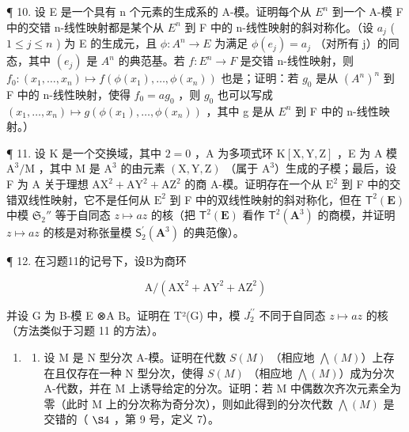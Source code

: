 ¶ 10. 设 E 是一个具有 n 个元素的生成系的 A-模。证明每个从 \(E^{n}\) 到一个 A-模 F 中的交错 n-线性映射都是某个从 \(E^{n}\) 到 F 中的 n-线性映射的斜对称化。（设 \(a_{j}\) ( \(1 \leqslant j \leqslant n\) ) 为 E 的生成元，且 \(\phi: A^{n} \rightarrow E\) 为满足 \(\phi(e_{j}) = a_{j}\) （对所有 j）的同态，其中 \((e_{j})\) 是 \(A^{n}\) 的典范基。若 \(f: E^{n} \rightarrow F\) 是交错 n-线性映射，则 \(f_{0}: (x_{1}, \ldots, x_{n}) \mapsto f(\phi(x_{1}), \ldots, \phi(x_{n}))\) 也是；证明：若 \(g_{0}\) 是从 \((A^{n})^{n}\) 到 F 中的 n-线性映射，使得 \(f_{0} = a g_{0}\) ，则 \(g_{0}\) 也可以写成 \((x_{1}, \ldots, x_{n}) \mapsto g(\phi(x_{1}), \ldots, \phi(x_{n}))\) ，其中 g 是从 \(E^{n}\) 到 F 中的 n-线性映射。）

¶ 11. 设 K 是一个交换域，其中 \(2 = 0\) ，A 为多项式环 \(\mathrm{K}[\mathrm{X}, \mathrm{Y}, \mathrm{Z}]\) ，E 为 A 模 \(\mathrm{A}^3/\mathrm{M}\) ，其中 M 是 \(\mathrm{A}^3\) 的由元素 \((\mathrm{X}, \mathrm{Y}, \mathrm{Z})\) （属于 \(\mathrm{A}^3\)）生成的子模；最后，设 F 为 A 关于理想 \(\mathrm{AX}^2 + \mathrm{AY}^2 + \mathrm{AZ}^2\) 的商 A-模。证明存在一个从 \(\mathrm{E}^2\) 到 F 中的交错双线性映射，它不是任何从 \(\mathrm{E}^2\) 到 F 中的双线性映射的斜对称化，但在 \(\mathsf{T}^2(\mathbf{E})\) 中模 \(\mathfrak{S}_2''\) 等于自同态 \(z \mapsto az\) 的核（把 \(\mathsf{T}^2(\mathbf{E})\) 看作 \(\mathsf{T}^2 (\mathbf{A}^3)\) 的商模，并证明 \(z\mapsto az\) 的核是对称张量模 \(\mathsf{S}_2^{\prime}(\mathbf{A}^3)\) 的典范像）。

¶ 12. 在习题11的记号下，设B为商环

\[
\mathrm{A} / (\mathrm{AX} ^ {2} + \mathrm{AY} ^ {2} + \mathrm{AZ} ^ {2})
\]

并设 G 为 B-模 E ⊗A B。证明在 T²(G) 中，模 \(J_{2}^{\prime\prime}\) 不同于自同态 \(z \mapsto az\) 的核（方法类似于习题 11 的方法）。

\begin{enumerate}
\def\labelenumi{\arabic{enumi}.}
\setcounter{enumi}{12}
\tightlist
\item
  \begin{enumerate}
  \def\labelenumii{(\alph{enumii})}
  \tightlist
  \item
    设 M 是 N 型分次 A-模。证明在代数 \(S(M)\) （相应地 \(\bigwedge(M)\)）上存在且仅存在一种 N 型分次，使得 \(S(M)\) （相应地 \(\bigwedge(M)\)）成为分次 A-代数，并在 M 上诱导给定的分次。证明：若 M 中偶数次齐次元素全为零（此时 M 上的分次称为奇分次），则如此得到的分次代数 \(\bigwedge(M)\) 是交错的（ \(\S 4\) ，第 9 号，定义 7）。
  \end{enumerate}
\end{enumerate}

